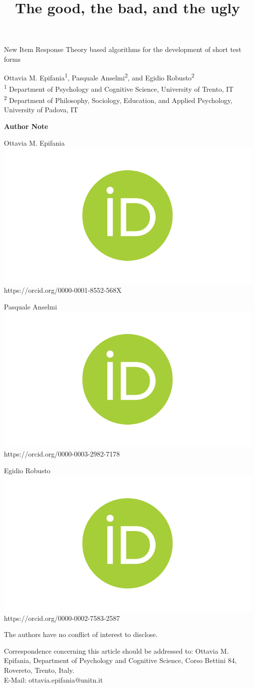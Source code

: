 \documentclass[12pt, a4paper, titilepage]{article}
\title{The good, the bad, and the ugly}
\author{}
\begin{document}
\vspace*{10mm}
\begin{center}
	\begin{LARGE}
 New Item Response Theory based algorithms for the development of short test forms
	\end{LARGE}
	
	\vspace{5mm}
	\begin{large}
		\doublespacing
		Ottavia M. Epifania\textsuperscript{1}, Pasquale Anselmi\textsuperscript{2}, and Egidio Robusto\textsuperscript{2} \\ 	\vspace{1.5mm}
		\textsuperscript{1} Department of Psychology and Cognitive Science, University of Trento, IT \\ \vspace{1.5mm}
	\textsuperscript{2}	Department of Philosophy, Sociology, Education, and Applied Psychology, University of Padova, IT
	\end{large}
\end{center}
\vspace{15mm}
\begin{center}
	\textbf{Author Note}
\end{center}
	
	Ottavia M. Epifania \includegraphics[width=0.06\linewidth]{orcid.png} https://orcid.org/0000-0001-8552-568X
	
	Pasquale Anselmi \includegraphics[width=0.06\linewidth]{orcid.png} https://orcid.org/0000-0003-2982-7178 
	
	Egidio Robusto \includegraphics[width=0.06\linewidth]{orcid.png} https://orcid.org/0000-0002-7583-2587
	
	\vspace{5mm}
	The authors have no conflict of interest to disclose.
	
	\vspace{5mm}
	
	Correspondence concerning this article should be addressed to: Ottavia M. Epifania, Department of Psychology and Cognitive Science, Corso Bettini 84, Rovereto, Trento, Italy. \\
	E-Mail: ottavia.epifania@unitn.it \\
\end{document}
